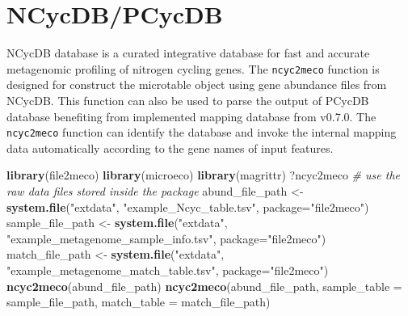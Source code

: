 \documentclass[
]{book}
\newenvironment{Shaded}{\begin{snugshade}}{\end{snugshade}}
\newcommand{\AttributeTok}[1]{\textcolor[rgb]{0.13,0.29,0.53}{#1}}
\newcommand{\CommentTok}[1]{\textcolor[rgb]{0.56,0.35,0.01}{\textit{#1}}}
\newcommand{\FunctionTok}[1]{\textcolor[rgb]{0.13,0.29,0.53}{\textbf{#1}}}
\newcommand{\NormalTok}[1]{#1}
\newcommand{\OtherTok}[1]{\textcolor[rgb]{0.56,0.35,0.01}{#1}}
\newcommand{\StringTok}[1]{\textcolor[rgb]{0.31,0.60,0.02}{#1}}
\begin{document}
\section{NCycDB/PCycDB}\label{ncycdbpcycdb}

NCycDB database \citep{Tu_NCycDB_2018} is a curated integrative database for fast and accurate metagenomic profiling of nitrogen cycling genes.
The \texttt{ncyc2meco} function is designed for construct the microtable object using gene abundance files from NCycDB.
This function can also be used to parse the output of PCycDB \citep{Zeng_PCycDB_2022} database benefiting from implemented mapping database from v0.7.0.
The \texttt{ncyc2meco} function can identify the database and invoke the internal mapping data automatically according to the gene names of input features.

\begin{Shaded}
\begin{Highlighting}[]
\FunctionTok{library}\NormalTok{(file2meco)}
\FunctionTok{library}\NormalTok{(microeco)}
\FunctionTok{library}\NormalTok{(magrittr)}
\NormalTok{?ncyc2meco}
\CommentTok{\# use the raw data files stored inside the package}
\NormalTok{abund\_file\_path }\OtherTok{\textless{}{-}} \FunctionTok{system.file}\NormalTok{(}\StringTok{"extdata"}\NormalTok{, }\StringTok{"example\_Ncyc\_table.tsv"}\NormalTok{, }\AttributeTok{package=}\StringTok{"file2meco"}\NormalTok{)}
\NormalTok{sample\_file\_path }\OtherTok{\textless{}{-}} \FunctionTok{system.file}\NormalTok{(}\StringTok{"extdata"}\NormalTok{, }\StringTok{"example\_metagenome\_sample\_info.tsv"}\NormalTok{, }\AttributeTok{package=}\StringTok{"file2meco"}\NormalTok{)}
\NormalTok{match\_file\_path }\OtherTok{\textless{}{-}} \FunctionTok{system.file}\NormalTok{(}\StringTok{"extdata"}\NormalTok{, }\StringTok{"example\_metagenome\_match\_table.tsv"}\NormalTok{, }\AttributeTok{package=}\StringTok{"file2meco"}\NormalTok{)}
\FunctionTok{ncyc2meco}\NormalTok{(abund\_file\_path)}
\FunctionTok{ncyc2meco}\NormalTok{(abund\_file\_path, }\AttributeTok{sample\_table =}\NormalTok{ sample\_file\_path, }\AttributeTok{match\_table =}\NormalTok{ match\_file\_path)}
\end{Highlighting}
\end{Shaded}
\end{document}
